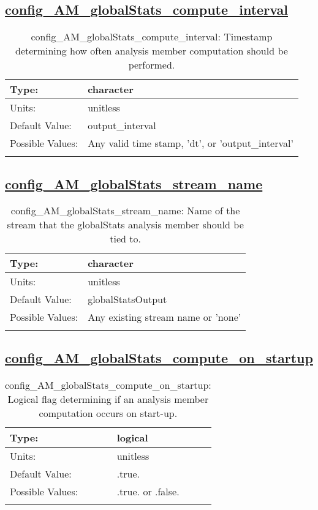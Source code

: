 \subsection[config\_AM\_globalStats\_compute\_interval]{\hyperref[sec:nm_tab_AM_globalStats]{config\_AM\_globalStats\_compute\_interval}}
\label{subsec:nm_sec_config_AM_globalStats_compute_interval}
\begin{center}
\begin{longtable}{| p{2.0in} || p{4.0in} |}
    \hline
    Type: & character \\
    \hline
    Units: & \si{unitless} \\
    \hline
    Default Value: & output\_interval \\
    \hline
    Possible Values: & Any valid time stamp, 'dt', or 'output\_interval' \\
    \hline
    \caption{config\_AM\_globalStats\_compute\_interval: Timestamp determining how often analysis member computation should be performed.}
\end{longtable}
\end{center}
\subsection[config\_AM\_globalStats\_stream\_name]{\hyperref[sec:nm_tab_AM_globalStats]{config\_AM\_globalStats\_stream\_name}}
\label{subsec:nm_sec_config_AM_globalStats_stream_name}
\begin{center}
\begin{longtable}{| p{2.0in} || p{4.0in} |}
    \hline
    Type: & character \\
    \hline
    Units: & \si{unitless} \\
    \hline
    Default Value: & globalStatsOutput \\
    \hline
    Possible Values: & Any existing stream name or 'none' \\
    \hline
    \caption{config\_AM\_globalStats\_stream\_name: Name of the stream that the globalStats analysis member should be tied to.}
\end{longtable}
\end{center}
\subsection[config\_AM\_globalStats\_compute\_on\_startup]{\hyperref[sec:nm_tab_AM_globalStats]{config\_AM\_globalStats\_compute\_on\_startup}}
\label{subsec:nm_sec_config_AM_globalStats_compute_on_startup}
\begin{center}
\begin{longtable}{| p{2.0in} || p{4.0in} |}
    \hline
    Type: & logical \\
    \hline
    Units: & \si{unitless} \\
    \hline
    Default Value: & .true. \\
    \hline
    Possible Values: & .true. or .false. \\
    \hline
    \caption{config\_AM\_globalStats\_compute\_on\_startup: Logical flag determining if an analysis member computation occurs on start-up.}
\end{longtable}
\end{center}
